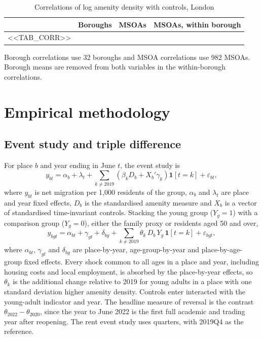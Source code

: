 \documentclass[11pt,a4paper]{article}
\newcommand{\tabnote}[1]{\par\smallskip\parbox{\linewidth}{\footnotesize #1}}
\begin{document}
\begin{table}[htbp]
\centering
\caption{Correlations of log amenity density with controls, London}\label{tab:corr}
\small
\begin{tabularx}{\linewidth}{@{}Lccc@{}}
\toprule
 & Boroughs & MSOAs & MSOAs, within borough \\
\midrule
<<TAB_CORR>>
\bottomrule
\end{tabularx}
\tabnote{Borough correlations use 32 boroughs and MSOA correlations use 982 MSOAs. Borough means are removed from both variables in the within-borough correlations.}
\end{table}

\section{Empirical methodology}\label{sec:method}

\subsection{Event study and triple difference}

For place $b$ and year ending in June $t$, the event study is
\begin{equation}\label{eq:es}
y_{bt} = \alpha_b + \lambda_t + \sum_{k \neq 2019} \left( \beta_k D_b + X_b' \gamma_k \right) \mathbf{1}[t = k] + \varepsilon_{bt},
\end{equation}
where $y_{bt}$ is net migration per 1,000 residents of the group, $\alpha_b$ and $\lambda_t$ are place and year fixed effects, $D_b$ is the standardised amenity measure and $X_b$ is a vector of standardised time-invariant controls. Stacking the young group ($Y_g = 1$) with a comparison group ($Y_g = 0$), either the family proxy or residents aged 50 and over,
\begin{equation}\label{eq:ddd}
y_{bgt} = \alpha_{bt} + \gamma_{gt} + \delta_{bg} + \sum_{k \neq 2019} \theta_k \, D_b \, Y_g \, \mathbf{1}[t = k] + \varepsilon_{bgt},
\end{equation}
where $\alpha_{bt}$, $\gamma_{gt}$ and $\delta_{bg}$ are place-by-year, age-group-by-year and place-by-age-group fixed effects. Every shock common to all ages in a place and year, including housing costs and local employment, is absorbed by the place-by-year effects, so $\theta_k$ is the additional change relative to 2019 for young adults in a place with one standard deviation higher amenity density. Controls enter interacted with the young-adult indicator and year. The headline measure of reversal is the contrast $\theta_{2022} - \theta_{2020}$, since the year to June 2022 is the first full academic and trading year after reopening. The rent event study uses quarters, with 2019Q4 as the reference.
\end{document}

